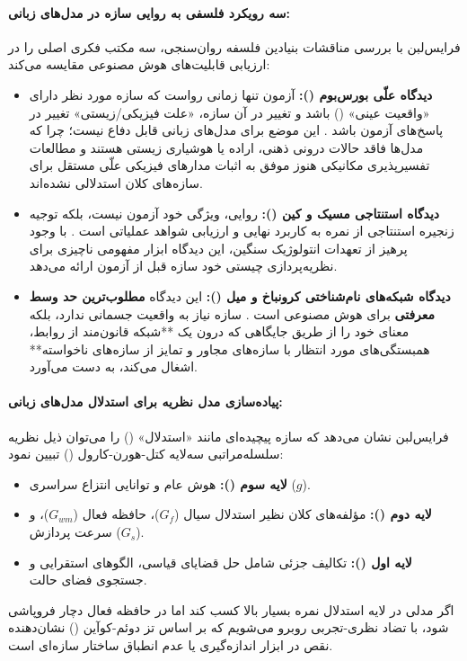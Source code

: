 \paragraph*{سه رویکرد فلسفی به روایی سازه در مدل‌های زبانی:}
فرایس‌لبن \cite{freiesleben2026establishing} با بررسی مناقشات بنیادین فلسفه روان‌سنجی، سه مکتب فکری اصلی را در ارزیابی قابلیت‌های هوش مصنوعی مقایسه می‌کند:
\begin{itemize}
    \item \textbf{دیدگاه علّی بورس‌بوم ():} آزمون تنها زمانی رواست که سازه مورد نظر دارای «واقعیت عینی» () باشد و تغییر در آن سازه، «علت فیزیکی/زیستی» تغییر در پاسخ‌های آزمون باشد \cite{borsboom2004concept}. این موضع برای مدل‌های زبانی قابل دفاع نیست؛ چرا که مدل‌ها فاقد حالات درونی ذهنی، اراده یا هوشیاری زیستی هستند و مطالعات تفسیرپذیری مکانیکی هنوز موفق به اثبات مدارهای فیزیکی علّی مستقل برای سازه‌های کلان استدلالی نشده‌اند.
    \item \textbf{دیدگاه استنتاجی مسیک و کین ():} روایی، ویژگی خود آزمون نیست، بلکه توجیه زنجیره استنتاجی از نمره به کاربرد نهایی و ارزیابی شواهد عملیاتی است \cite{messick1989meaning, kane2013validating}. با وجود پرهیز از تعهدات انتولوژیک سنگین، این دیدگاه ابزار مفهومی ناچیزی برای نظریه‌پردازی چیستی خود سازه قبل از آزمون ارائه می‌دهد.
    \item \textbf{دیدگاه شبکه‌های نام‌شناختی کرونباخ و میل ():} این دیدگاه \textbf{مطلوب‌ترین حد وسط معرفتی} برای هوش مصنوعی است \cite{cronbach1955construct, freiesleben2026establishing}. سازه نیاز به واقعیت جسمانی ندارد، بلکه معنای خود را از طریق جایگاهی که درون یک **شبکه قانون‌مند از روابط، همبستگی‌های مورد انتظار با سازه‌های مجاور و تمایز از سازه‌های ناخواسته** اشغال می‌کند، به دست می‌آورد.
\end{itemize}

\paragraph*{پیاده‌سازی مدل نظریه  برای استدلال مدل‌های زبانی:}
فرایس‌لبن \cite{freiesleben2026establishing} نشان می‌دهد که سازه پیچیده‌ای مانند «استدلال» () را می‌توان ذیل نظریه سلسله‌مراتبی سه‌لایه کتل-هورن-کارول () تبیین نمود:
\begin{itemize}
    \item \textbf{لایه سوم ():} هوش عام و توانایی انتزاع سراسری ($g$).
    \item \textbf{لایه دوم ():} مؤلفه‌های کلان نظیر استدلال سیال ($G_f$)، حافظه فعال ($G_{wm}$)، و سرعت پردازش ($G_s$).
    \item \textbf{لایه اول ():} تکالیف جزئی شامل حل قضایای قیاسی، الگوهای استقرایی و جستجوی فضای حالت.
\end{itemize}
اگر مدلی در لایه استدلال نمره بسیار بالا کسب کند اما در حافظه فعال دچار فروپاشی شود، با تضاد نظری-تجربی روبرو می‌شویم که بر اساس تز دوئم-کوآین () نشان‌دهنده نقص در ابزار اندازه‌گیری یا عدم انطباق ساختار سازه‌ای است.

